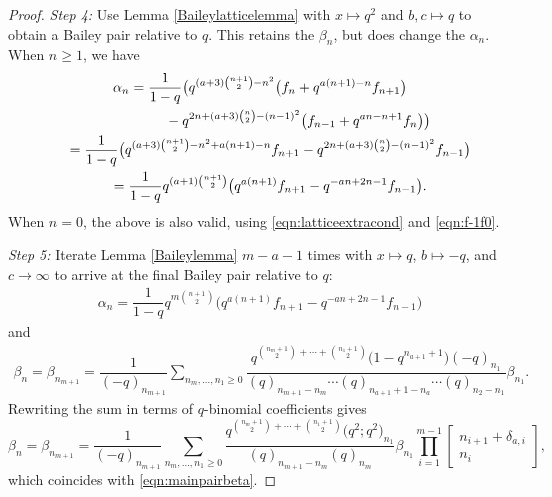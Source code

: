 \documentclass[11pt]{article}
\numberwithin{equation}{section}
\numberwithin{equation}{section}
\begin{document}
\begin{proof}
	
	{\it Step 4\emph{:}} Use Lemma \ref{Baileylatticelemma} with $x \mapsto q^2$ and $b,c \mapsto q$ to obtain a Bailey pair relative to $q$. This retains the $\beta_n$, but does change the $\alpha_n$. When $n \geq 1$, we have
	\begin{gather*}
		\alpha_n = \dfrac{1}{1-q}
		\bigl(
		q^{(a+3)\binom{n+1}{2}-n^2}\bigl(f_n+q^{a(n+1)-n}f_{n+1}\bigr) \\ \hphantom{\alpha_n = \dfrac{1}{1-q}\bigl(}{}
		- q^{2n+(a+3)\binom{n}{2}-(n-1)^2}\bigl(f_{n-1}+q^{an-n+1}f_{n}\bigr)
		\bigr)\\ \hphantom{\alpha_n}{}
		=
		\dfrac{1}{1-q}
		\bigl(
		q^{(a+3)\binom{n+1}{2}-n^2+a(n+1)-n}f_{n+1}
		-
		q^{2n+(a+3)\binom{n}{2}-(n-1)^2}f_{n-1}
		\bigr)\\ \hphantom{\alpha_n}{}
		= \dfrac{1}{1-q}q^{(a+1)\binom{n+1}{2}}\bigl(
		q^{a(n+1)}f_{n+1} -q^{-an+2n-1}f_{n-1}
		\bigr).
	\end{gather*}
	When $n=0$, the above is also valid, using \eqref{eqn:latticeextracond} and \eqref{eqn:f-1f0}.
	
	
	{\it Step 5\emph{:}} Iterate Lemma \ref{Baileylemma} $m-a-1$ times with $x\mapsto q$, $b\mapsto -q$, and $c\rightarrow \infty$ to arrive at the final Bailey pair relative to $q$:
	\begin{align*}
		\alpha_n
		=
		\dfrac{1}{1-q}q^{m\binom{n+1}{2}}\bigl(
		q^{a(n+1)}f_{n+1} -q^{-an+2n-1}f_{n-1}
		\bigr)
	\end{align*}
	and
	\begin{align*}
		\beta_n=\beta_{n_{m+1}}=
		\dfrac{1}{(-q)_{n_{m+1}}}\sum_{n_m,\dots,n_1\geq 0}
		\dfrac{q^{\binom{n_{m}+1}{2}+\cdots+\binom{n_1+1}{2}}\bigl(1-q^{n_{a+1}+1}\bigr)(-q)_{n_1}}
		{(q)_{n_{m+1}-n_{m}}\cdots
			(q)_{n_{a+1}+1-n_a}\cdots (q)_{n_2-n_1}}\beta_{n_1}.
	\end{align*}
	Rewriting the sum in terms of $q$-binomial coefficients gives{\samepage
	\begin{equation*} %
		\beta_n = \beta_{n_{m+1}} = \frac{1}{(-q)_{n_{m+1}}} \sum_{n_m, \dots, n_1 \geq 0} \frac{q^{\binom{n_m+1}{2} + \cdots + \binom{n_1+1}{2}}\bigl(q^2;q^2\bigr)_{n_1}}{(q)_{n_{m+1}-n_m} (q)_{n_m}} \beta_{n_1} \prod_{i=1}^{m-1} \begin{bmatrix} n_{i+1} + \delta_{a,i} \\ n_i \end{bmatrix},
	\end{equation*}
	which coincides with \eqref{eqn:mainpairbeta}.}
	

\end{proof}
\end{document}
